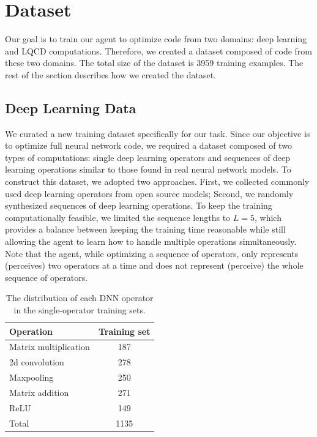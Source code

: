 \documentclass[10pt,twocolumn]{article}
\begin{document}
\section{Dataset}
\label{sec:dataset}

Our goal is to train our agent to optimize code from two domains: deep learning and LQCD computations. Therefore, we created a dataset composed of code from these two domains. The total size of the dataset is 3959 training examples. The rest of the section describes how we created the dataset.

\subsection{Deep Learning Data}

We curated a new training dataset specifically for our task. Since our objective is to optimize full neural network code, we required a dataset composed of two types of computations: single deep learning operators and sequences of deep learning operations similar to those found in real neural network models. To construct this dataset, we adopted two approaches. First, we collected commonly used deep learning operators from open source models; Second, we randomly synthesized sequences of deep learning operations. To keep the training computationally feasible, we limited the sequence lengths to $L=5$, which provides a balance between keeping the training time reasonable while still allowing the agent to learn how to handle multiple operations simultaneously. Note that the agent, while optimizing a sequence of operators, only represents (perceives) two operators at a time and does not represent (perceive) the whole sequence of operators.

\begin{table}[t]
\centering
\caption{The distribution of each DNN operator in the single-operator training sets.}
\label{tab:dnnops}
\begin{tabular}{lc}
\toprule
Operation & Training set \\
\midrule
Matrix multiplication & 187 \\
2d convolution & 278 \\
Maxpooling & 250 \\
Matrix addition & 271 \\
ReLU & 149 \\
\midrule
Total & 1135 \\
\bottomrule
\end{tabular}
\end{table}
\end{document}
